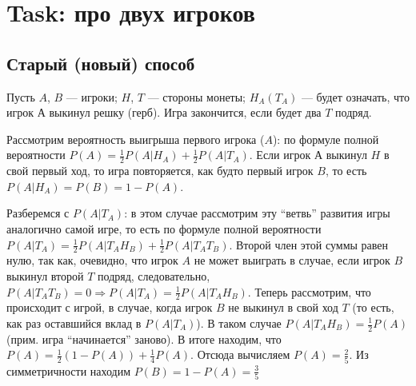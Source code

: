 \section*{Task:  про двух игроков}
\subsection*{Старый (новый) способ}
Пусть $A$, $B$ --- игроки; $H$, $T$ --- стороны монеты; $H_A (T_A)$ --- будет означать, что игрок $А$ выкинул решку (герб). Игра закончится, если будет два $T$ подряд.

Рассмотрим вероятность выигрыша первого игрока ($A$): по формуле полной вероятности $P(A) = \frac{1}{2} P(A|H_A) + \frac12 P(A|T_A)$. Если игрок $А$ выкинул $H$ в свой первый ход, то игра повторяется, как будто первый игрок $B$, то есть $P(A|H_A) = P(B) = 1 - P(A)$.

Разберемся с $P(A|T_A)$:
в этом случае рассмотрим эту ``ветвь'' развития игры аналогично самой игре, то есть по формуле полной вероятности $P(A|T_A) = \frac12 P(A|T_AH_B) + \frac12 P(A|T_AT_B)$. Второй член этой суммы равен нулю, так как, очевидно, что игрок $A$ не может выиграть в случае, если игрок $B$ выкинул второй $T$ подряд, следовательно, $P(A|T_AT_B) = 0 \Longrightarrow P(A|T_A) = \frac12 P(A|T_AH_B)$. Теперь рассмотрим, что происходит с игрой, в случае, когда игрок $B$ не выкинул в свой ход $T$ (то есть, как раз оставшийся вклад в $P(A|T_A)$). В таком случае $P(A|T_AH_B) = \frac12 P(A)$ (прим. игра ``начинается'' заново).
В итоге находим, что $P(A) = \frac12 (1 - P(A)) + \frac14 P(A)$.
Отсюда вычисляем $P(A) = \frac25$. Из симметричности находим $P(B) = 1 - P(A) = \frac35$

